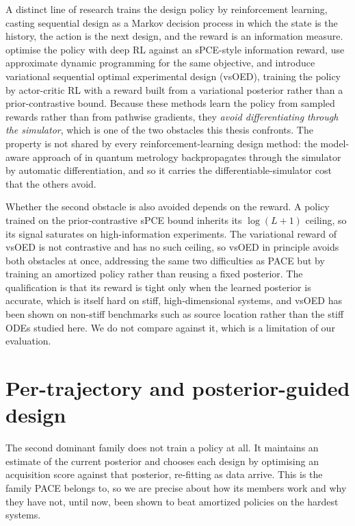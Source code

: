 A distinct line of research trains the design policy by reinforcement learning, casting
sequential design as a Markov decision process in which the state is the history, the action
is the next design, and the reward is an information measure. \citet{blau2022optimizing}
optimise the policy with deep RL against an sPCE-style information reward,
\citet{huan2016sequential} use approximate dynamic programming for the same objective, and
\citet{shen2025vsoed} introduce variational sequential optimal experimental design (vsOED),
training the policy by actor-critic RL with a reward built from a variational posterior
rather than a prior-contrastive bound. Because these methods learn the policy from sampled
rewards rather than from pathwise gradients, they \emph{avoid differentiating through the
simulator}, which is one of the two obstacles this thesis confronts. The property is not
shared by every reinforcement-learning design method: the model-aware approach of
\citet{belliardo2024modelaware} in quantum metrology backpropagates through the simulator by
automatic differentiation, and so it carries the differentiable-simulator cost that the
others avoid.

Whether the second obstacle is also avoided depends on the reward. A policy trained on the
prior-contrastive sPCE bound inherits its $\log(L+1)$ ceiling, so its signal saturates on
high-information experiments. The variational reward of vsOED is not contrastive and has no
such ceiling, so vsOED in principle avoids both obstacles at once, addressing the same two
difficulties as PACE but by training an amortized policy rather than reusing a fixed
posterior. The qualification is that its reward is tight only when the learned posterior is
accurate, which is itself hard on stiff, high-dimensional systems, and vsOED has been shown
on non-stiff benchmarks such as source location rather than the stiff ODEs studied here. We
do not compare against it, which is a limitation of our evaluation.


\section{Per-trajectory and posterior-guided design}
\label{sec:rw-pertraj}

The second dominant family does not train a policy at all. It maintains an estimate of the
current posterior and chooses each design by optimising an acquisition score against that
posterior, re-fitting as data arrive. This is the family PACE belongs to, so we are precise
about how its members work and why they have not, until now, been shown to beat amortized
policies on the hardest systems.

